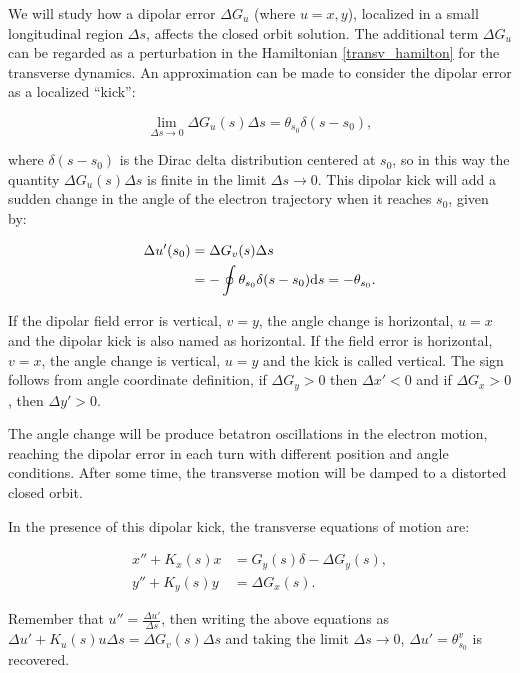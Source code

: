 We will study how a dipolar error $\Delta G_u$ (where $u=x, y$), localized in a small longitudinal region $\Delta s$, affects the closed orbit solution. The additional term $\Delta G_u$ can be regarded as a perturbation in the Hamiltonian \eqref{transv_hamilton} for the transverse dynamics. An approximation can be made to consider the dipolar error as a localized ``kick'': 

\begin{equation*}
    \lim_{\Delta s \rightarrow 0}\Delta G_u(s)\Delta s = \theta_{s_0} \delta(s - s_0),
\end{equation*}

where $\delta(s-s_0)$ is the Dirac delta distribution centered at $s_0$, so in this way the quantity $\Delta G_u(s)\Delta s$ is finite in the limit $\Delta s \rightarrow 0$. This dipolar kick will add a sudden change in the angle of the electron trajectory when it reaches $s_0$, given by:

\begin{align*}
    \Delta u'(s_0) &= \Delta G_v(s) \Delta s \\
    &= -\oint \theta_{s_0} \delta(s - s_0) \mathrm{d} s = -\theta_{s_0}.
\end{align*}

If the dipolar field error is vertical, $v=y$, the angle change is horizontal, $u=x$ and the dipolar kick is also named as horizontal. If the field error is horizontal, $v=x$, the angle change is vertical, $u=y$ and the kick is called vertical. The sign follows from angle coordinate definition, if $\Delta G_y > 0$ then $\Delta x' < 0$ and if $\Delta G_x > 0$, then $\Delta y' > 0$.

The angle change will be produce betatron oscillations in the electron motion, reaching the dipolar error in each turn with different position and angle conditions. After some time, the transverse motion will be damped to a distorted closed orbit. 

In the presence of this dipolar kick, the transverse equations of motion  are:

\begin{align}
    x'' + K_x(s)x &= G_y(s) \delta - \Delta G_y(s), \\
    y'' + K_y(s)y &= \Delta G_x(s).
\end{align}

Remember that $u'' = \frac{\Delta u'}{\Delta s}$, then writing the above equations as $\Delta u' + K_u(s) u \Delta s = \Delta G_v(s) \Delta s$ and taking the limit $\Delta s \rightarrow 0$, $\Delta u' = \theta^{v}_{s_0}$ is recovered. 

